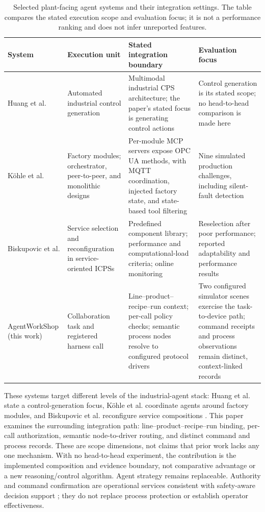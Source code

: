 \begin{table}[!t]
\centering
\caption{Selected plant-facing agent systems and their integration settings.
The table compares the stated execution scope and evaluation focus; it is not
a performance ranking and does not infer unreported features.}
\label{tab:nearest}
\small
\setlength{\tabcolsep}{4pt}
\begin{tabularx}{\textwidth}{@{}p{2.3cm}p{2.5cm}XX@{}}
\toprule
System & Execution unit & Stated integration boundary & Evaluation focus \\
\midrule
Huang et al. \cite{huang2026made} & Automated industrial control generation & Multimodal industrial CPS architecture; the paper's stated focus is generating control actions & Control generation is its stated scope; no head-to-head comparison is made here \\
K{\"o}hle et al. \cite{koehle2026llmdriven} & Factory modules; orchestrator, peer-to-peer, and monolithic designs & Per-module MCP servers expose OPC UA methods, with MQTT coordination, injected factory state, and state-based tool filtering & Nine simulated production challenges, including silent-fault detection \\
Biskupovic et al. \cite{biskupovic2025supervision} & Service selection and reconfiguration in service-oriented ICPSs & Predefined component library; performance and computational-load criteria; online monitoring & Reselection after poor performance; reported adaptability and performance results \\
\midrule
AgentWorkShop (this work) & Collaboration task and registered harness call & Line--product--recipe--run context; per-call policy checks; semantic process nodes resolve to configured protocol drivers & Two configured simulator scenes exercise the task-to-device path; command receipts and process observations remain distinct, context-linked records \\
\bottomrule
\end{tabularx}
\end{table}

These systems target different levels of the industrial-agent stack: Huang et
al. state a control-generation focus, K{\"o}hle et al. coordinate agents around
factory modules, and Biskupovic et al. reconfigure service compositions
\cite{huang2026made,koehle2026llmdriven,biskupovic2025supervision}. This paper
examines the surrounding integration path: line--product--recipe--run binding,
per-call authorization, semantic node-to-driver routing, and distinct command
and process records. These are scope dimensions, not claims that prior work
lacks any one mechanism. With no head-to-head experiment, the contribution is
the implemented composition and evidence boundary, not comparative advantage
or a new reasoning/control algorithm. Agent strategy remains replaceable.
Authority and command confirmation are operational services consistent with
safety-aware decision support \cite{jiang2026agentic}; they do not replace
process protection or establish operator effectiveness.

